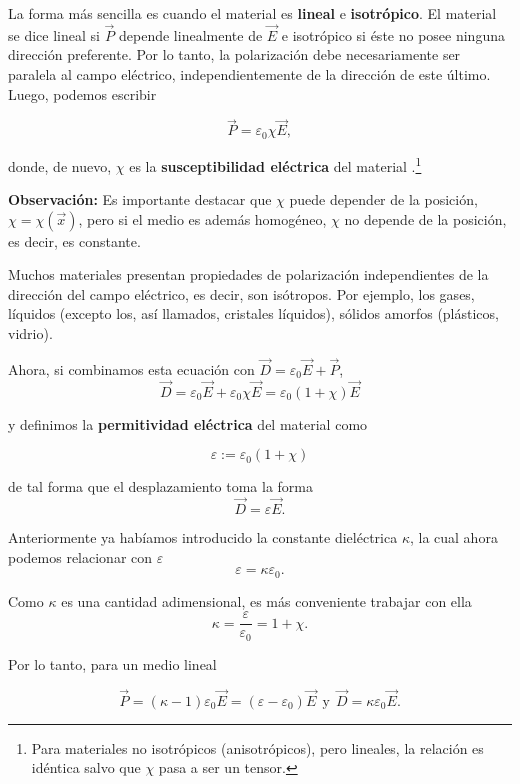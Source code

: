 La forma más sencilla es cuando el material es \textbf{lineal} e \textbf{isotrópico}. El material se dice lineal si  $\Vec{P}$ depende linealmente de $\Vec{E}$ e isotrópico si éste no posee ninguna dirección preferente. Por lo tanto, la polarización debe necesariamente ser paralela al campo eléctrico, independientemente de la dirección de este último. Luego, podemos escribir 
\begin{shaded}
    $$\Vec{P} = \varepsilon_0 \chi \Vec{E},$$
\end{shaded}

donde, de nuevo, $\chi$ es la \textbf{susceptibilidad eléctrica} del material .\footnote{Para materiales no isotrópicos (anisotrópicos), pero lineales, la relación es idéntica salvo que $\chi$ pasa a ser un tensor.}

\textbf{Observación:} Es importante destacar que $\chi$ puede depender de la posición, $\chi = \chi(\Vec{x})$, pero si el medio es además homogéneo, $\chi$ no depende de la posición, es decir, es constante.

Muchos materiales presentan propiedades de polarización independientes de la dirección del campo eléctrico, es decir, son isótropos. Por ejemplo, los gases, líquidos (excepto los, así llamados, cristales líquidos), sólidos amorfos (plásticos, vidrio).

Ahora, si combinamos esta ecuación con $\Vec{D} = \varepsilon_0 \Vec{E} + \Vec{P}$,
$$\Vec{D} = \varepsilon_0 \Vec{E} + \varepsilon_0 \chi \Vec{E} = \varepsilon_0 (1 +\chi) \Vec{E}$$

y definimos la \textbf{permitividad eléctrica} del material como
\begin{shaded}
$$\varepsilon := \varepsilon_0 (1 +\chi) $$    
\end{shaded}

de tal forma que el desplazamiento toma la forma
$$\Vec{D} = \varepsilon \Vec{E}.$$

Anteriormente ya habíamos introducido la constante dieléctrica $\kappa$, la cual ahora podemos relacionar con $\varepsilon$
$$\varepsilon = \kappa \varepsilon_0.$$

Como $\kappa$ es una cantidad adimensional, es más conveniente trabajar con ella
$$\kappa = \frac{\varepsilon}{\varepsilon_0} = 1 + \chi.$$

Por lo tanto, para un medio lineal
\begin{shaded}
    $$\Vec{P} = (\kappa - 1)\varepsilon_0 \Vec{E} = (\varepsilon - \varepsilon_0) \Vec{E} ~~\text{y}~~ \Vec{D} = \kappa\varepsilon_0 \Vec{E}.$$
\end{shaded}

